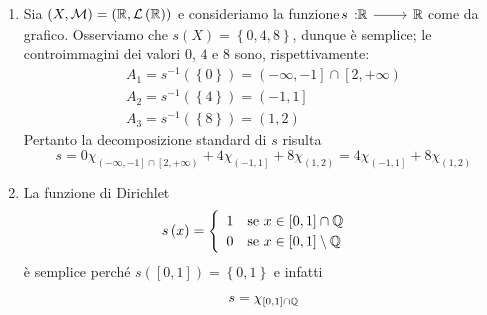 \begin{examples}~{} \label{funzionesemplice}
	\begin{enumerate}
		\item Sia $\left(X,\mathcal{M}\right)=\left(\mathbb{R},\mathcal{L}\left(\mathbb{R}\right)\right)$ e consideriamo la funzione $\funz{s}{\realset}{\realset}$ come da grafico.
		Osserviamo che $s\left(X\right)=\left\{0,4,8\right\}$, dunque è semplice; le controimmagini dei valori $0$, $4$ e $8$ sono, rispettivamente:
		\begin{equation*}
			\begin{array}{l}
				A_1=s^{-1}\left(\left\{0\right\}\right)=\left(-\infty,-1\right]\cap\left[2,+\infty\right)\\
				A_2=s^{-1}\left(\left\{4\right\}\right)=\left(-1,1\right]\\
				A_3=s^{-1}\left(\left\{8\right\}\right)=\left(1,2\right)
			\end{array}
		\end{equation*}
	Pertanto la decomposizione standard di $s$ risulta
	\begin{equation*}
	s=0\chi_{\left(-\infty,-1\right]\cap\left[2,+\infty\right)}+4\chi_{\left(-1,1\right]}+8\chi_{\left(1,2\right)}=4\chi_{\left(-1,1\right]}+8\chi_{\left(1,2\right)}
	\end{equation*}
	\item La funzione di Dirichlet
		\begin{equation}
		s\left(x\right)=
		\begin{cases}
			\begin{array}{ll}
				1&\text{se }x\in\left[0,1\right]\cap\mathbb{Q}\\
				0&\text{se }x\in\left[0,1\right]\setminus\mathbb{Q}\\
			\end{array}
		\end{cases}
	\end{equation}
	è semplice perché $s\left(\left[0,1\right]\right)=\left\{0,1\right\}$ e infatti
	\begin{equation*}
		s=\chi_{\left[0,1\right]\cap\mathbb{Q}}
	\end{equation*}
	\end{enumerate}
\end{examples}
